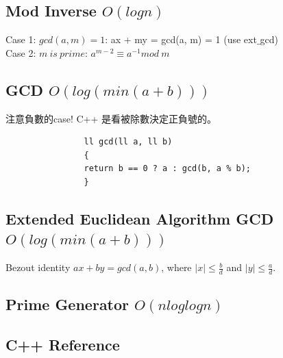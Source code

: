 \documentclass[10pt,oneside]{article}
\begin{document}
\begin{landscape}
\begin{multicols}{2}
				\subsection{Mod Inverse $ O(log n) $}
				
				{\normalsize 
					Case 1: $gcd(a, m) = 1$:  ax + my = gcd(a, m) = 1 (use ext$\_$gcd) \\
					
					\noindent Case 2: $m\ is\ prime$: $a^{m - 2} \equiv a^{-1} mod\ m$ 
				}
				
				\subsection{GCD $O(log( min(a + b) ))$}
				
				{\large 注意負數的case! C++ 是看被除數決定正負號的。}
				
				\begin{verbatim}
				ll gcd(ll a, ll b)
				{
				return b == 0 ? a : gcd(b, a % b);
				}
				\end{verbatim}
				
				\subsection{Extended Euclidean Algorithm GCD $O(log( min(a + b) ))$}
				
				{\normalsize 
					Bezout identity $ax + by = gcd(a, b)$, where $\mid x \mid \leq \frac b d$ and $\mid y \mid \leq \frac a d$.
				}
				
				
				\subsection{Prime Generator $ O(n loglogn) $}
				
				\subsection{C++ Reference}
				
				
				
				

\end{multicols}
\end{landscape}
\end{document}
